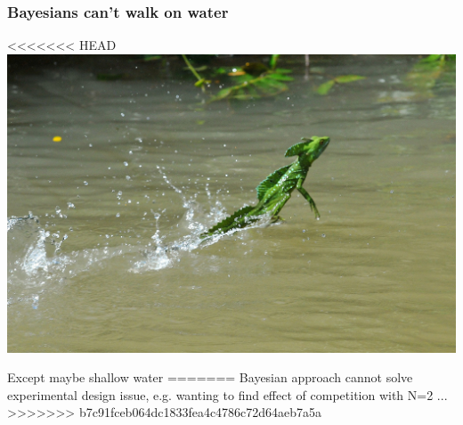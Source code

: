\documentclass{beamer}
\begin{document}
 \begin{frame}
  \frametitle{\bf Bayesians can't walk on water}
  
<<<<<<< HEAD
 \includegraphics[width=\linewidth,height=\textheight,keepaspectratio]{water.jpg}
 
 Except maybe shallow water
=======
  Bayesian approach cannot solve experimental design issue, e.g. wanting to find effect of competition with N=2 ...
>>>>>>> b7c91fceb064dc1833fea4c4786c72d64aeb7a5a
  
 \end{frame}
 
\end{document}
